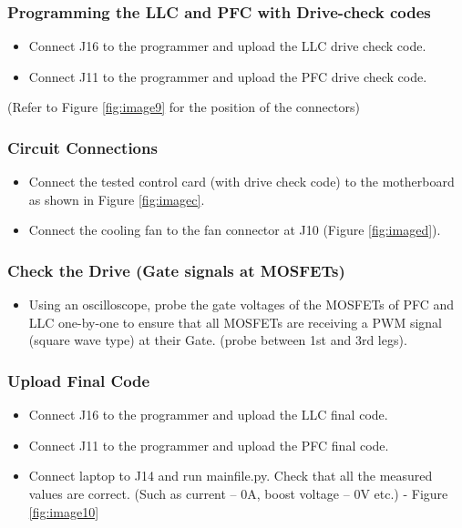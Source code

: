 \subsubsection{Programming the LLC and PFC with Drive-check codes}
\begin{itemize}
    \item Connect J16 to the programmer and upload the LLC drive check code.
    \item Connect J11 to the programmer and upload the PFC drive check code.
\end{itemize}
(Refer to Figure \ref{fig:image9} for the position of the connectors)

\subsubsection{Circuit Connections}
\begin{itemize}
    \item Connect the tested control card (with drive check code) to the motherboard as shown in Figure \ref{fig:imagec}.
    \item Connect the cooling fan to the fan connector at J10 (Figure \ref{fig:imaged}).
\end{itemize}

\subsubsection{Check the Drive (Gate signals at MOSFETs)}
\begin{itemize}
    \item Using an oscilloscope, probe the gate voltages of the MOSFETs of PFC and LLC one-by-one to ensure that all MOSFETs are receiving a PWM signal (square wave type) at their Gate. (probe between 1st and 3rd legs).
\end{itemize}

\subsubsection{Upload Final Code}
\begin{itemize}
    \item Connect J16 to the programmer and upload the LLC final code. 
    \item Connect J11 to the programmer and upload the PFC final code.
    \item Connect laptop to J14 and run mainfile.py. Check that all the measured values are correct. (Such as current – 0A, boost voltage – 0V etc.) - Figure \ref{fig:image10}
\end{itemize}



